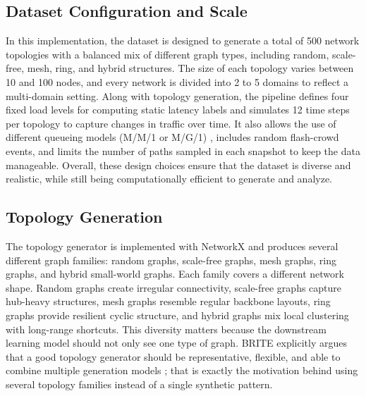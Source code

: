 \documentclass[12pt]{article}
\begin{document}
\subsection{Dataset Configuration and Scale}
In this implementation, the dataset is designed to generate a total of 500 network topologies with a balanced mix of different graph types, including random, scale-free, mesh, ring, and hybrid structures. The size of each topology varies between 10 and 100 nodes, and every network is divided into 2 to 5 domains to reflect a multi-domain setting. Along with topology generation, the pipeline defines four fixed load levels for computing static latency labels and simulates 12 time steps per topology to capture changes in traffic over time. It also allows the use of different queueing models (M/M/1 or M/G/1) \cite{mm1}, includes random flash-crowd events, and limits the number of paths sampled in each snapshot to keep the data manageable. Overall, these design choices ensure that the dataset is diverse and realistic, while still being computationally efficient to generate and analyze.

\subsection{Topology Generation}
The topology generator is implemented with NetworkX \cite{networkX} and produces several different graph families: random graphs, scale-free graphs, mesh graphs, ring graphs, and hybrid small-world graphs. Each family covers a different network shape. Random graphs create irregular connectivity, scale-free graphs capture hub-heavy structures, mesh graphs resemble regular backbone layouts, ring graphs provide resilient cyclic structure, and hybrid graphs mix local clustering with long-range shortcuts. This diversity matters because the downstream learning model should not only see one type of graph. BRITE explicitly argues that a good topology generator should be representative, flexible, and able to combine multiple generation models \cite{brite}; that is exactly the motivation behind using several topology families instead of a single synthetic pattern.
\end{document}
